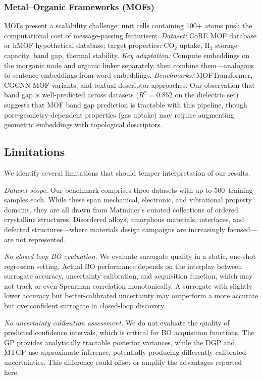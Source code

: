 \subsubsection{Metal--Organic Frameworks (MOFs)}

MOFs present a scalability challenge: unit cells containing 100+ atoms push the computational cost of message-passing featurisers.
\emph{Dataset:} CoRE MOF database or hMOF hypothetical database; target properties: CO$_2$ uptake, H$_2$ storage capacity, band gap, thermal stability.
\emph{Key adaptation:} Compute embeddings on the inorganic node and organic linker separately, then combine them---analogous to sentence embeddings from word embeddings.
\emph{Benchmarks:} MOFTransformer, CGCNN-MOF variants, and textual descriptor approaches.
Our observation that band gap is well-predicted across datasets ($R^2 = 0.852$ on the dielectric set) suggests that MOF band gap prediction is tractable with this pipeline, though pore-geometry-dependent properties (gas uptake) may require augmenting geometric embeddings with topological descriptors.

\FloatBarrier
\subsection{Limitations}
\label{sec:limitations}

We identify several limitations that should temper interpretation of our results.

\emph{Dataset scope.}
Our benchmark comprises three datasets with up to 500~training samples each.
While these span mechanical, electronic, and vibrational property domains, they are all drawn from Matminer's curated collections of ordered crystalline structures.
Disordered alloys, amorphous materials, interfaces, and defected structures---where materials design campaigns are increasingly focused---are not represented.

\emph{No closed-loop BO evaluation.}
We evaluate surrogate quality in a static, one-shot regression setting.
Actual BO performance depends on the interplay between surrogate accuracy, uncertainty calibration, and acquisition function, which may not track \Rtwo{} or even Spearman correlation monotonically.
A surrogate with slightly lower accuracy but better-calibrated uncertainty may outperform a more accurate but overconfident surrogate in closed-loop discovery.

\emph{No uncertainty calibration assessment.}
We do not evaluate the quality of predicted confidence intervals, which is critical for BO acquisition functions.
The GP provides analytically tractable posterior variances, while the DGP and MTGP use approximate inference, potentially producing differently calibrated uncertainties.
This difference could offset or amplify the \Rtwo{} advantages reported here.

